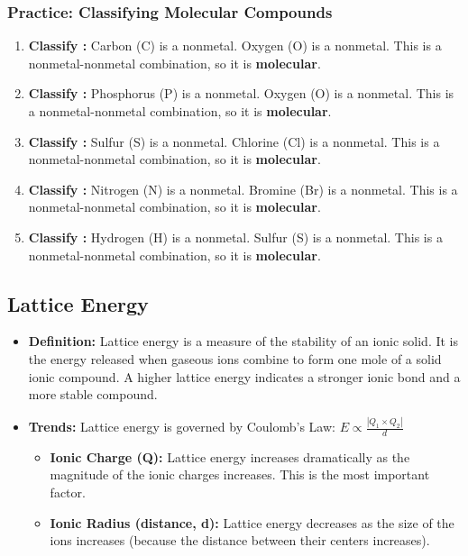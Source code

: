 \documentclass{article}
\begin{document}
\subsubsection*{Practice: Classifying Molecular Compounds}
\begin{enumerate}[itemsep=5pt]
    \item \textbf{Classify :} Carbon (C) is a nonmetal. Oxygen (O) is a nonmetal. This is a nonmetal-nonmetal combination, so it is \textbf{molecular}.
    \item \textbf{Classify :} Phosphorus (P) is a nonmetal. Oxygen (O) is a nonmetal. This is a nonmetal-nonmetal combination, so it is \textbf{molecular}.
    \item \textbf{Classify :} Sulfur (S) is a nonmetal. Chlorine (Cl) is a nonmetal. This is a nonmetal-nonmetal combination, so it is \textbf{molecular}.
    \item \textbf{Classify :} Nitrogen (N) is a nonmetal. Bromine (Br) is a nonmetal. This is a nonmetal-nonmetal combination, so it is \textbf{molecular}.
    \item \textbf{Classify :} Hydrogen (H) is a nonmetal. Sulfur (S) is a nonmetal. This is a nonmetal-nonmetal combination, so it is \textbf{molecular}.
\end{enumerate}

\subsection*{Lattice Energy}
\begin{itemize}[itemsep=5pt]
    \item \textbf{Definition:} Lattice energy is a measure of the stability of an ionic solid. It is the energy released when gaseous ions combine to form one mole of a solid ionic compound. A higher lattice energy indicates a stronger ionic bond and a more stable compound.
    \item \textbf{Trends:} Lattice energy is governed by Coulomb's Law: \( E \propto \frac{|Q_1 \times Q_2|}{d} \)
    \begin{itemize}
        \item \textbf{Ionic Charge (Q):} Lattice energy increases dramatically as the magnitude of the ionic charges increases. This is the most important factor.
        \item \textbf{Ionic Radius (distance, d):} Lattice energy decreases as the size of the ions increases (because the distance between their centers increases).
    \end{itemize}
\end{itemize}
\end{document}
